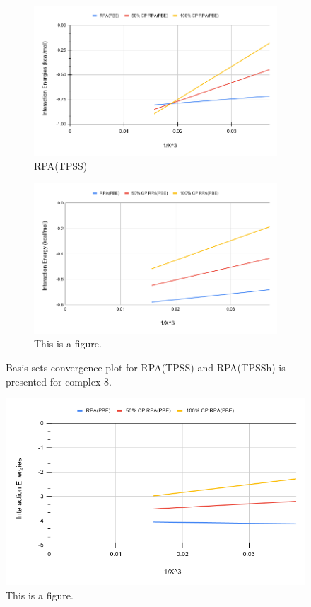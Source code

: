 \documentclass[11pt]{article}
\begin{document}
\begin{figure}[hbpt]
  \centering
  \begin{subfigure}{\textwidth}
    \center
    \includegraphics[scale=0.45]{tpss_8.png}
    \caption{RPA(TPSS)}
    \label{fig:tpss_8}
  \end{subfigure}
  \begin{subfigure}{\textwidth}
    \center
    \includegraphics[scale=0.45]{tpssh_8.png}
    \caption{This is a figure.}
    \label{fig:tpssh_8}
  \end{subfigure}
  \caption{Basis sets convergence plot for RPA(TPSS) and RPA(TPSSh) is
    presented for complex 8.}
  \label{fig:complex_8}
\end{figure}

\begin{figure}
  \includegraphics[scale=0.5]{tpss_11.png}
  \caption{This is a figure.}
  \label{fig:<name>}
\end{figure}
\end{document}
